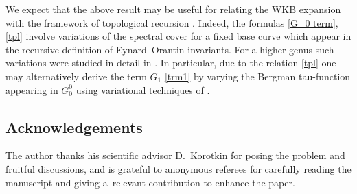 \documentclass[pdftex]{sigma}
\numberwithin{equation}{section}
\theoremstyle{definition}
\begin{document}
We expect that the above result may be useful for relating the WKB expansion with the framework of topological recursion \cite{Eynard_2007}. Indeed, the formulas \eqref{G_0 term}, \eqref{tpl} involve variations of the spectral cover for a fixed base curve which appear in the recursive definition of Eynard--Orantin invariants. For a higher genus such variations were studied in detail in \cite{Baraglia_2019, bertola2019spaces, klimov2021var}. In particular, due to the relation \eqref{tpl} one may alternatively derive the term $G_1$ \eqref{trm1} by varying the Bergman tau-function appearing in $G^0_0$ using variational techniques of \cite{klimov2021var}.

\subsection*{Acknowledgements} The author thanks his scientific advisor D.~Korotkin for posing the problem and fruitful discussions, and is grateful to anonymous referees for carefully reading the manuscript and giving a~relevant contribution to enhance the paper.
\end{document}
